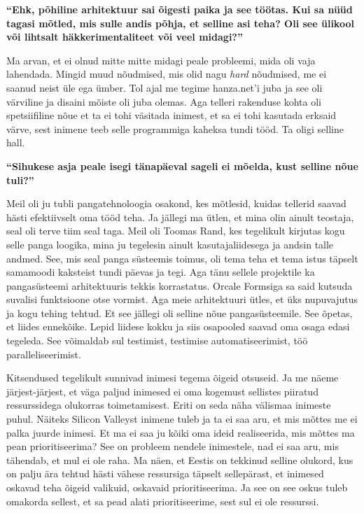 \textbf{\enquote{Ehk, põhiline arhitektuur sai õigesti paika ja see töötas. Kui
sa nüüd tagasi mõtled, mis sulle andis põhja, et selline asi teha? Oli see
ülikool või lihtsalt häkkerimentaliteet või veel midagi?}}

Ma arvan, et ei olnud mitte mitte midagi peale probleemi, mida oli vaja
lahendada. Mingid muud nõudmised, mis olid nagu \emph{hard} nõudmised, me ei
saanud neist üle ega ümber. Tol ajal me tegime hanza.net'i
juba ja see oli värviline ja disaini mõiste oli juba olemas. Aga telleri
rakenduse kohta oli spetsiifiline nõue et ta ei tohi väsitada inimest, et sa ei
tohi kasutada erksaid värve, sest inimene teeb selle programmiga kaheksa tundi
tööd. Ta oligi selline hall.

\textbf{\enquote{Sihukese asja peale isegi tänapäeval sageli ei mõelda, kust
selline nõue tuli?}}

Meil oli ju tubli pangatehnoloogia osakond, kes mõtlesid, kuidas tellerid
saavad hästi efektiivselt oma tööd teha. Ja jällegi ma ütlen, et mina olin
ainult teostaja, seal oli terve tiim seal taga. Meil oli Toomas
Rand, kes tegelikult kirjutas kogu selle panga
loogika, mina ju tegelesin ainult kasutajaliidesega ja andsin talle andmed.
See, mis seal panga süsteemis toimus, oli tema teha et tema istus täpselt
samamoodi kaksteist tundi päevas ja tegi. Aga tänu sellele projektile ka
pangasüsteemi arhitektuuris tekkis korrastatus. Orcale Formsiga sa said kutsuda
suvalisi funktsioone otse vormist. Aga meie arhitektuuri ütles, et üks
nupuvajutus ja kogu tehing tehtud. Et see jällegi oli selline nõue
pangasüsteemile. See õpetas, et liides ennekõike. Lepid liidese kokku ja siis
osapooled saavad oma osaga edasi tegeleda. See võimaldab sul testimist,
testimise automatiseerimist, töö paralleliseerimist. 

Kitsendused tegelikult sunnivad inimesi tegema õigeid otsuseid. Ja me näeme
järjest-järjest, et väga paljud inimesed ei oma kogemust sellistes piiratud
ressurssidega olukorras toimetamisest. Eriti on seda näha välismaa inimeste
puhul. Näiteks Silicon Valleyst inimene tuleb ja ta ei saa aru, et mis mõttes
me ei palka juurde inimesi. Et ma ei saa ju kõiki oma ideid realiseerida, mis
mõttes ma pean prioritiseerima? See on probleem nendele inimestele, nad ei saa
aru, mis tähendab, et mul ei ole raha. Ma näen, et Eestis on tekkinud selline
olukord, kus on palju ära tehtud hästi vähese ressursiga täpselt sellepärast,
et inimesed oskavad teha õigeid valikuid, oskavaid prioritiseerima. Ja see on
see oskus tuleb omakorda sellest, et sa pead alati prioritiseerime, sest sul ei
ole ressurssi.


